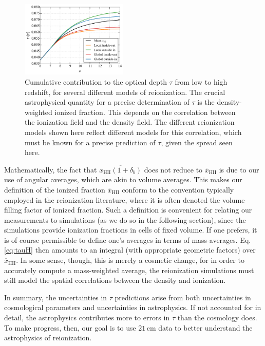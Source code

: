 \documentclass[twocolumn,aps,prd,nofootinbib,showpacs,superscriptaddress]{revtex4-1}
\begin{document}
\begin{figure}[!]
	\centering
	\includegraphics[width=0.45\textwidth]{figures/insideOutvsOutsideIn.pdf}
	\caption{Cumulative contribution to the optical depth $\tau$ from low to high redshift, for several different models of reionization. The crucial astrophysical quantity for a precise determination of $\tau$ is the density-weighted ionized fraction. This depends on the correlation between the ionization field and the density field. The different reionization models shown here reflect different models for this correlation, which must be known for a precise prediction of $\tau$, given the spread seen here.}
	\label{fig:InsideOutvsOutsideIn}
\end{figure}

Mathematically, the fact that $\overline{x_\textrm{HII} (1+\delta_b) }$ does not reduce to $\overline{x}_\textrm{HII}$ is due to our use of angular averages, which are akin to volume averages. This makes our definition of the ionized fraction $\overline{x}_\textrm{HII}$ conform to the convention typically employed in the reionization literature, where it is often denoted the volume filling factor of ionized fraction. Such a definition is convenient for relating our measurements to simulations (as we do so in the following section), since the simulations provide ionization fractions in cells of fixed volume. If one prefers, it is of course permissible to define one's averages in terms of mass-averages. Eq. \eqref{eq:tauH} then amounts to an integral (with appropriate geometric factors) over $\overline{x}_\textrm{HII}$. In some sense, though, this is merely a cosmetic change, for in order to accurately compute a mass-weighted average, the reionization simulations must still model the spatial correlations between the density and ionization.

In summary, the uncertainties in $\tau$ predictions arise from both uncertainties in cosmological parameters and uncertainties in astrophysics. If not accounted for in detail, the astrophysics contributes more to errors in $\tau$ than the cosmology does. To make progress, then, our goal is to use $21\,\textrm{cm}$ data to better understand the astrophysics of reionization.
\end{document}
